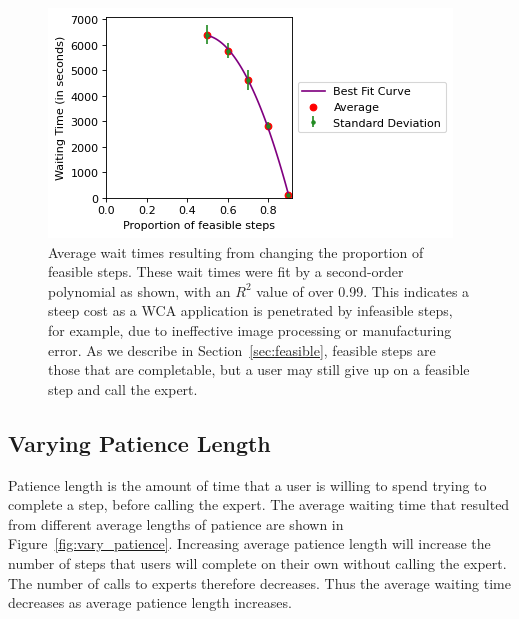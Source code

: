 \begin{figure}[h]
  \includegraphics{figures/montecarlo/vary_success.png}
  \caption[
  Average wait times resulting from changing the proportion of feasible steps
  ]{
    Average wait times resulting from changing the proportion of feasible steps.
    These wait times were fit by a second-order polynomial as shown, with an
    $R^2$ value of over 0.99.
    This indicates a steep cost as a WCA application is penetrated by infeasible
    steps, for example, due to ineffective image processing or manufacturing
    error.
    As we describe in Section~\ref{sec:feasible}, feasible steps are those that
    are completable, but a user may still give up on a feasible step and call
    the expert.
  }\label{fig:vary_success}
\end{figure}

\subsection{Varying Patience Length}

Patience length is the amount of time that a user is willing to spend trying to
complete a step, before calling the expert.
The average waiting time that resulted from different average lengths of
patience are shown in Figure~\ref{fig:vary_patience}.
Increasing average patience length will increase the number of steps that users
will complete on their own without calling the expert.
The number of calls to experts therefore decreases.
Thus the average waiting time decreases as average patience length increases.


